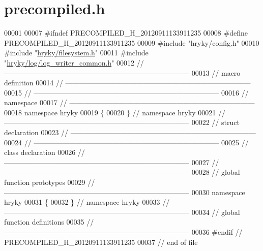 \hypertarget{filesystem_2src_2precompiled_8h_source}{\section{precompiled.\-h}
}

\begin{DoxyCode}
00001 
00007 \textcolor{preprocessor}{#ifndef PRECOMPILED\_H\_20120911133911235}
00008 \textcolor{preprocessor}{}\textcolor{preprocessor}{#define PRECOMPILED\_H\_20120911133911235}
00009 \textcolor{preprocessor}{}\textcolor{preprocessor}{#include "hryky/config.h"}
00010 \textcolor{preprocessor}{#include "\hyperlink{filesystem_8h}{hryky/filesystem.h}"}
00011 \textcolor{preprocessor}{#include "\hyperlink{log__writer__common_8h}{hryky/log/log_writer_common.h}"}
00012 \textcolor{comment}{//
      ------------------------------------------------------------------------------}
00013 \textcolor{comment}{// macro definition}
00014 \textcolor{comment}{//
      ------------------------------------------------------------------------------}
00015 \textcolor{comment}{//
      ------------------------------------------------------------------------------}
00016 \textcolor{comment}{// namespace}
00017 \textcolor{comment}{//
      ------------------------------------------------------------------------------}
00018 \textcolor{keyword}{namespace }hryky
00019 \{
00020 \} \textcolor{comment}{// namespace hryky}
00021 \textcolor{comment}{//
      ------------------------------------------------------------------------------}
00022 \textcolor{comment}{// struct declaration}
00023 \textcolor{comment}{//
      ------------------------------------------------------------------------------}
00024 \textcolor{comment}{//
      ------------------------------------------------------------------------------}
00025 \textcolor{comment}{// class declaration}
00026 \textcolor{comment}{//
      ------------------------------------------------------------------------------}
00027 \textcolor{comment}{//
      ------------------------------------------------------------------------------}
00028 \textcolor{comment}{// global function prototypes}
00029 \textcolor{comment}{//
      ------------------------------------------------------------------------------}
00030 \textcolor{keyword}{namespace }hryky
00031 \{
00032 \} \textcolor{comment}{// namespace hryky}
00033 \textcolor{comment}{//
      ------------------------------------------------------------------------------}
00034 \textcolor{comment}{// global function definitions}
00035 \textcolor{comment}{//
      ------------------------------------------------------------------------------}
00036 \textcolor{preprocessor}{#endif // PRECOMPILED\_H\_20120911133911235}
00037 \textcolor{preprocessor}{}\textcolor{comment}{// end of file}
\end{DoxyCode}
